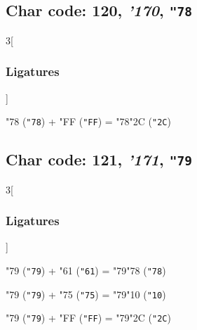 \documentclass{article}
\newlength{\maxcharwidth}
\begin{document}
\subsection{Char code: 120, {\it'170}, {\tt"78}}
\label{char_120}


\begin{multicols}{3}[\subsubsection{Ligatures}]

{\testfont\char"78\noboundary} ({\tt"78}) + {\testfont\char"FF\noboundary} ({\tt"FF}) = {\testfont\char"78\noboundary}{\testfont\char"2C\noboundary} ({\tt"2C}) 

\end{multicols}

\subsection{Char code: 121, {\it'171}, {\tt"79}}
\label{char_121}


\begin{multicols}{3}[\subsubsection{Ligatures}]

{\testfont\char"79\noboundary} ({\tt"79}) + {\testfont\char"61\noboundary} ({\tt"61}) = {\testfont\char"79\noboundary}{\testfont\char"78\noboundary} ({\tt"78}) 

{\testfont\char"79\noboundary} ({\tt"79}) + {\testfont\char"75\noboundary} ({\tt"75}) = {\testfont\char"79\noboundary}{\testfont\char"10\noboundary} ({\tt"10}) 

{\testfont\char"79\noboundary} ({\tt"79}) + {\testfont\char"FF\noboundary} ({\tt"FF}) = {\testfont\char"79\noboundary}{\testfont\char"2C\noboundary} ({\tt"2C}) 

\end{multicols}
\end{document}
